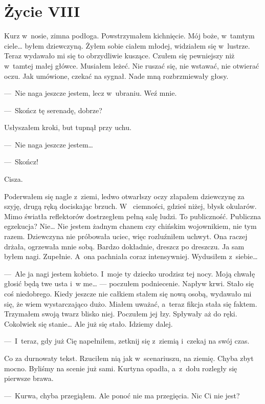 \chapter{Życie VIII}

Kurz w~nosie, zimna podłoga. Powstrzymałem kichnięcie. Mój boże, w~tamtym ciele… byłem dziewczyną. Żyłem sobie ciałem 
młodej, widziałem się w~lustrze. Teraz wydawało mi się to obrzydliwie kuszące. Czułem się pewniejszy niż w~tamtej 
małej główce. Musiałem leżeć. Nie ruszać się, nie wstawać, nie otwierać oczu. Jak umówione, czekać na sygnał. Nade 
mną rozbrzmiewały głosy.

---~Nie naga jeszcze jestem, lecz w~ubraniu. Weź mnie.

---~Skończ tę serenadę, dobrze?

Usłyszałem kroki, but tupnął przy uchu.

---~Nie naga jeszcze jestem…

---~Skończ! 

Cisza. 

Poderwałem się nagle z~ziemi, ledwo otwarłszy oczy złapałem dziewczynę za szyję, drugą ręką dociskając brzuch. W~
ciemności, gdzieś niżej, błysk okularów. Mimo światła reflektorów dostrzegłem pełną salę ludzi. To publiczność. 
Publiczna egzekucja? Nie… Nie jestem żadnym chanem czy chińskim wojownikiem, nie tym razem. Dziewczyna nie próbowała 
uciec,  więc rozluźniłem uchwyt. Ona raczej drżała, ogrzewała mnie sobą. Bardzo dokładnie, dreszcz po dreszczu. Ja 
sam byłem nagi. Zupełnie. A~ona pachniała coraz intensywniej. Wydusiłem z~siebie…

---~Ale ja nagi jestem kobieto. I~moje ty dziecko urodzisz tej nocy. Moją chwałę głosić będą twe usta i~w me… ---
poczułem podniecenie. Napływ krwi. Stało się coś niedobrego. Kiedy jeszcze nie całkiem stałem się nową osobą, 
wydawało mi się, że wiem wystarczająco dużo. Miałem uważać, a~teraz fikcja stała się faktem. Trzymałem swoją twarz 
blisko niej. Poczułem jej łzy. Spływały aż do ręki. Cokolwiek się stanie… Ale już się stało. Idziemy dalej.

---~I~teraz, gdy już Cię napełniłem, zetknij się z~ziemią i~czekaj na swój czas.

Co za durnowaty tekst. Rzuciłem nią jak w~scenariuszu, na ziemię. Chyba zbyt mocno. Byliśmy na scenie już sami. 
Kurtyna opadła, a~z~dołu rozległy się pierwsze brawa.

---~Kurwa, chyba przegiąłem. Ale ponoć nie ma przegięcia. Nic Ci nie jest?

